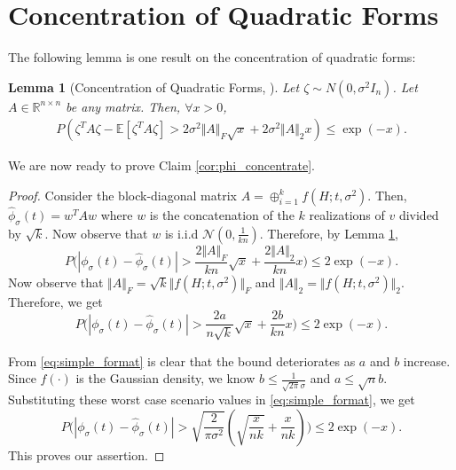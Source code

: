 \documentclass{article}
\newtheorem{lemma}[theorem]{Lemma}
\newcommand{\R}{\mathbb{R}}
\newcommand{\phis}{\phi_{\sigma}}
\newcommand{\E}[1]{\mathbb{E}\left[#1\right]}
\begin{document}
\section{Concentration of Quadratic Forms}
\label{app:more_concentration}
The following lemma is one result on the concentration of quadratic forms:
\begin{lemma}[Concentration of Quadratic Forms, \cite{bellec2014concentration}] Let $\zeta \sim N(0, \sigma^2 I_n)$. Let $A\in \R^{n\times n}$ be any matrix. Then, $\forall x > 0$,
\label{lem:concentration}
\begin{align} 
P(\zeta^T A \zeta - \E{\zeta^T A \zeta} > 2\sigma^2 \Vert A \Vert_F \sqrt{x} + 2\sigma^2 \Vert A\Vert_2 x) \nonumber \leq \exp(-x).
\end{align}
\end{lemma}
We are now ready to prove Claim \ref{cor:phi_concentrate}.
\begin{proof}
Consider the block-diagonal matrix $A = \oplus_{i=1}^k  f(H; t, \sigma^2)$. Then, $\widehat{\phi}_{\sigma}(t) = w^T A w$ where $w$ is the concatenation of the $k$ realizations of $v$ divided by $\sqrt{k}$. Now observe that $w$ is i.i.d $\mathcal{N}(0, \frac{1}{kn})$. Therefore, by Lemma \ref{lem:concentration}, 
\begin{equation*}
P\bigg(|\phis(t) - \widehat{\phi}_{\sigma}(t)| > \frac{2\Vert A \Vert_F}{k n} \sqrt{x} +  \frac{2\Vert A \Vert_2}{k n} x \bigg) \leq 2\exp(-x).
\end{equation*}
Now observe that $\Vert A \Vert_F = \sqrt{k}\Vert f(H; t, \sigma^2) \Vert_F$ and $\Vert A \Vert_2 = \Vert f(H; t, \sigma^2)\Vert_2$. Therefore, we get 
\begin{equation}\label{eq:simple_format}
P\bigg(|\phis(t) - \widehat{\phi}_{\sigma}(t)| > \frac{2a}{n\sqrt{k}} \sqrt{x} +  \frac{2b}{k n} x \bigg) \leq 2\exp(-x).
\end{equation}

From \eqref{eq:simple_format} is clear that the bound deteriorates as $a$ and $b$ increase. Since $f(\cdot)$ is the Gaussian density, we know $b \leq \frac{1}{\sqrt{2 \pi} \sigma}$ and $a \leq \sqrt{n} b$. Substituting these worst case scenario values in \eqref{eq:simple_format}, we get
\begin{equation}
P\bigg(|\phis(t) - \widehat{\phi}_{\sigma}(t)| > \sqrt{\frac{2}{\pi \sigma^2}} (\sqrt{\frac{x}{nk}} + \frac{x}{nk}) \bigg) \leq 2\exp(-x).
\end{equation}
This proves our assertion.
\end{proof}
\end{document}
